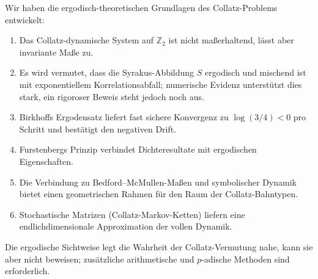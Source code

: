 \documentclass[12pt,a4paper]{article}
\begin{document}
Wir haben die ergodisch-theoretischen Grundlagen des Collatz-Problems entwickelt:
\begin{enumerate}
  \item Das Collatz-dynamische System auf $\mathbb{Z}_2$ ist nicht maßerhaltend,
        lässt aber invariante Maße zu.
  \item Es wird vermutet, dass die Syrakus-Abbildung $S$ ergodisch und mischend ist
        mit exponentiellem Korrelationsabfall; numerische Evidenz unterstützt dies stark,
        ein rigoroser Beweis steht jedoch noch aus.
  \item Birkhoffs Ergodensatz liefert fast sichere Konvergenz zu $\log(3/4) < 0$ pro
        Schritt und bestätigt den negativen Drift.
  \item Furstenbergs Prinzip verbindet Dichteresultate mit ergodischen Eigenschaften.
  \item Die Verbindung zu Bedford--McMullen-Maßen und symbolischer Dynamik bietet einen
        geometrischen Rahmen für den Raum der Collatz-Bahntypen.
  \item Stochastische Matrizen (Collatz-Markov-Ketten) liefern eine endlichdimensionale
        Approximation der vollen Dynamik.
\end{enumerate}
Die ergodische Sichtweise legt die Wahrheit der Collatz-Vermutung nahe, kann sie aber
nicht beweisen; zusätzliche arithmetische und $p$-adische Methoden sind erforderlich.
\end{document}
